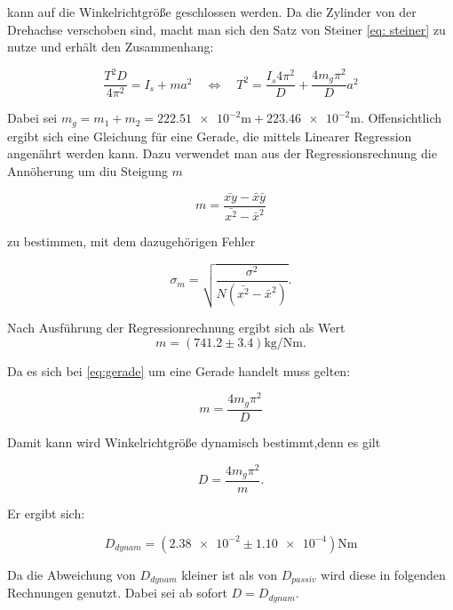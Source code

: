 kann auf die Winkelrichtgröße geschlossen werden.
Da die Zylinder von der Drehachse verschoben sind, macht man sich den Satz von Steiner \eqref{eq: steiner} zu nutze und erhält den Zusammenhang:

\begin{equation}
\label{eq:gerade}
\frac{T^2D}{4\pi^2}=I_s+ma^2\quad \Leftrightarrow \quad T^2=\frac{I_s 4\pi^2}{D}+\frac{4m_g\pi^2}{D}a^2
\end{equation}

Dabei sei $m_g=m_1+m_2=\num{222.51e-2}\si{\meter}+\num{223.46e-2}\si{\meter}$.
Offensichtlich ergibt sich eine Gleichung für eine Gerade, die mittels Linearer Regression angenährt werden kann.
Dazu verwendet man aus der Regressionsrechnung
die Annöherung um diu Steigung $m$ 

\begin{equation*}
m=\frac{\bar{xy}-\bar{x}\bar{y}}{\bar{x^2}-\bar{x}^2}
\end{equation*}

 zu bestimmen, mit dem dazugehörigen Fehler

\begin{equation*}
\sigma_m=\sqrt{\frac{\sigma^2}{N(\bar{x^2}-\bar{x}^2)}}.
\end{equation*}

Nach Ausführung der Regressionrechnung ergibt sich als Wert
\begin{equation}
\label{eq: steigung}
m=\left(\num{741.2}\pm\num{3.4}\right) \si{\kilogram\per\newton\meter}.
\end{equation}

Da es sich bei \eqref{eq:gerade} um eine Gerade handelt muss gelten:

\begin{equation*}
m=\frac{4m_g\pi^2}{D}
\end{equation*}

Damit kann wird Winkelrichtgröße dynamisch bestimmt,denn es gilt

\begin{equation*}
D=\frac{4m_g\pi^2}{m}.
\end{equation*}

Er ergibt sich:

\begin{equation}
\label{winkelrichtgroesse_dynamisch}
D_{dynam}=\left(\num{2.38e-2} \pm \num{1.10e-4}\right)\si{\newton\meter}
\end{equation}

Da die Abweichung von $D_{dynam}$ kleiner ist als von $D_{passiv}$ wird 
diese in folgenden Rechnungen genutzt.
Dabei sei ab sofort $D=D_{dynam}$.


